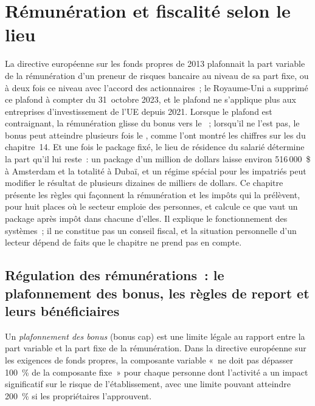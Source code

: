 \chapter{Rémunération et fiscalité selon le lieu}\label{ch:in:pay-regulation-and-tax-by-location}

La directive européenne sur les fonds propres de 2013 plafonnait la part variable de la rémunération d'un preneur de risques bancaire au niveau de sa part fixe, ou à deux fois
ce niveau avec l'accord des actionnaires~; le Royaume-Uni a supprimé ce plafond à compter du 31~octobre 2023, et le plafond ne s'applique plus
aux entreprises d'investissement de l'UE depuis 2021. Lorsque le plafond est contraignant, la rémunération glisse du bonus vers le ~; lorsqu'il ne l'est pas, le bonus
peut atteindre plusieurs fois le , comme l'ont montré les chiffres sur les  du chapitre~14. Et une fois le package fixé, le lieu de résidence du salarié
détermine la part qu'il lui reste~: un package d'un million de dollars laisse environ 516\,000~\$ à Amsterdam et la totalité
à Dubaï, et un régime spécial pour les impatriés peut modifier le résultat de plusieurs dizaines de milliers de dollars. Ce chapitre présente les règles qui
façonnent la rémunération et les impôts qui la prélèvent, pour huit places où le secteur emploie des personnes, et calcule ce que vaut un package
après impôt dans chacune d'elles. Il explique le fonctionnement des systèmes~; il ne constitue pas un conseil fiscal, et la situation personnelle
d'un lecteur dépend de faits que le chapitre ne prend pas en compte.

\section{Régulation des rémunérations~: le plafonnement des bonus, les règles de report et leurs bénéficiaires}

\begin{definition}\label{def:in:pay-regulation-and-tax-by-location:cap}
Un \emph{plafonnement des bonus} (bonus cap) est une limite légale au rapport entre la part variable et la part fixe de la rémunération. Dans la directive européenne sur les exigences de fonds propres, la
composante variable «~ne doit pas dépasser 100~\% de la composante fixe~» pour chaque personne dont l'activité a un impact significatif sur le
risque de l'établissement, avec une limite pouvant atteindre 200~\% si les propriétaires l'approuvent.
\end{definition}

